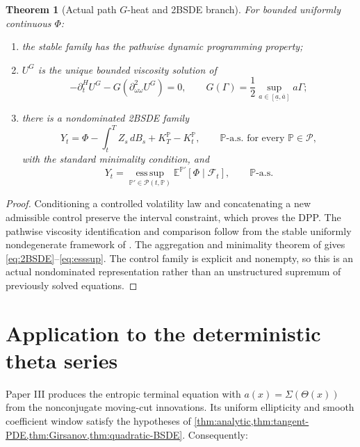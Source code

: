 \documentclass[11pt,reqno]{amsart}
\newtheorem{theorem}{Theorem}[section]
\theoremstyle{definition}
\theoremstyle{remark}
\newcommand{\E}{\mathbb E}
\newcommand{\F}{\mathcal F}
\newcommand{\Pp}{\mathbb P}
\newcommand{\cP}{\mathcal P}
\newcommand{\esssup}{\operatorname*{ess\,sup}}
\begin{document}
\begin{theorem}[Actual path $G$-heat and 2BSDE branch]\label{thm:2BSDE}
For bounded uniformly continuous $\Phi$:
\begin{enumerate}[label=(\roman*)]
\item the stable family has the pathwise dynamic programming property;
\item $U^G$ is the unique bounded viscosity solution of
\begin{equation}\label{eq:GPPDE}
 -\partial_t^HU^G-G(\partial_{\omega\omega}^2U^G)=0,
 \qquad
 G(\Gamma)=\frac12\sup_{a\in[\underline a,\overline a]}a\Gamma;
\end{equation}
\item there is a nondominated 2BSDE family
\begin{equation}\label{eq:2BSDE}
 Y_t=\Phi-\int_t^TZ_s\,dB_s+K_T^{\Pp}-K_t^{\Pp},
 \qquad \Pp\text{-a.s. for every }\Pp\in\cP,
\end{equation}
with the standard minimality condition, and
\begin{equation}\label{eq:esssup}
 Y_t=\esssup_{\Pp'\in\cP(t,\Pp)}
 \E^{\Pp'}[\Phi\mid\F_t],
 \qquad \Pp\text{-a.s.}
\end{equation}
\end{enumerate}
\end{theorem}

\begin{proof}
Conditioning a controlled volatility law and concatenating a new admissible
control preserve the interval constraint, which proves the DPP.  The pathwise
viscosity identification and comparison follow from the stable uniformly
nondegenerate framework of
\cite{EkrenTouziZhang2014I,EkrenTouziZhang2014II}.  The aggregation and
minimality theorem of \cite{SonerTouziZhang2012} gives
\eqref{eq:2BSDE}--\eqref{eq:esssup}.  The control family is explicit and
nonempty, so this is an actual nondominated representation rather than an
unstructured supremum of previously solved equations.
\end{proof}

\section{Application to the deterministic theta series}\label{sec:application}

Paper III produces the entropic terminal equation with
$a(x)=\Sigma(\Theta(x))$ from the nonconjugate moving-cut innovations.  Its
uniform ellipticity and smooth coefficient window satisfy the hypotheses of
\cref{thm:analytic,thm:tangent-PDE,thm:Girsanov,thm:quadratic-BSDE}.
Consequently:
\end{document}
